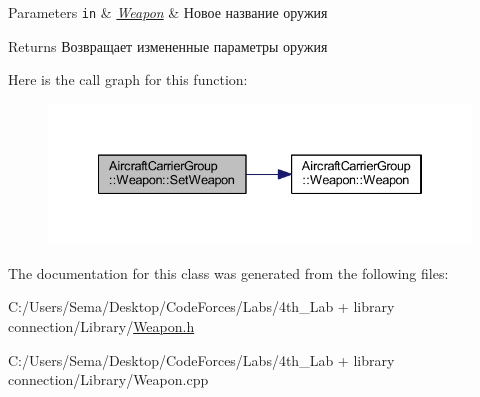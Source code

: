\begin{DoxyParams}[1]{Parameters}
\mbox{\tt in}  & {\em \mbox{\hyperlink{class_aircraft_carrier_group_1_1_weapon}{Weapon}}} & Новое название оружия \\
\hline
\end{DoxyParams}
\begin{DoxyReturn}{Returns}
Возвращает измененные параметры оружия 
\end{DoxyReturn}
Here is the call graph for this function\+:
\nopagebreak
\begin{figure}[H]
\begin{center}
\leavevmode
\includegraphics[width=334pt]{class_aircraft_carrier_group_1_1_weapon_a3a73357d6f4f8676192cc10f255e82d2_cgraph}
\end{center}
\end{figure}


The documentation for this class was generated from the following files\+:\begin{DoxyCompactItemize}
\item 
C\+:/\+Users/\+Sema/\+Desktop/\+Code\+Forces/\+Labs/4th\+\_\+\+Lab + library connection/\+Library/\mbox{\hyperlink{_weapon_8h}{Weapon.\+h}}\item 
C\+:/\+Users/\+Sema/\+Desktop/\+Code\+Forces/\+Labs/4th\+\_\+\+Lab + library connection/\+Library/Weapon.\+cpp\end{DoxyCompactItemize}
